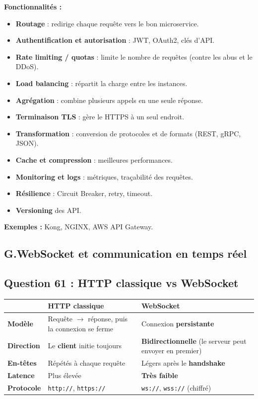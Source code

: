 \documentclass[12pt,a4paper]{article}
\begin{document}
\textbf{Fonctionnalit\'es :}
\begin{itemize}
  \item \textbf{Routage} : redirige chaque requ\^ete vers le bon microservice.
  \item \textbf{Authentification et autorisation} : JWT, OAuth2, cl\'es d'API.
  \item \textbf{Rate limiting / quotas} : limite le nombre de requ\^etes (contre les abus et le DDoS).
  \item \textbf{Load balancing} : r\'epartit la charge entre les instances.
  \item \textbf{Agr\'egation} : combine plusieurs appels en une seule r\'eponse.
  \item \textbf{Terminaison TLS} : g\`ere le HTTPS \`a un seul endroit.
  \item \textbf{Transformation} : conversion de protocoles et de formats (REST, gRPC, JSON).
  \item \textbf{Cache et compression} : meilleures performances.
  \item \textbf{Monitoring et logs} : m\'etriques, tra\c{c}abilit\'e des requ\^etes.
  \item \textbf{R\'esilience} : Circuit Breaker, retry, timeout.
  \item \textbf{Versioning} des API.
\end{itemize}

\noindent\textbf{Exemples :} Kong, NGINX, AWS API Gateway.

\subsection*{G.WebSocket et communication en temps r\'eel}

\subsection*{Question 61 : HTTP classique vs WebSocket}

\begin{table}[h!]
\centering
\begin{tabularx}{\textwidth}{@{}l Y Y@{}}
\toprule
 & \textbf{HTTP classique} & \textbf{WebSocket} \\
\midrule
\textbf{Mod\`ele} & Requ\^ete $\rightarrow$ r\'eponse, puis la connexion se ferme & Connexion \textbf{persistante} \\
\textbf{Direction} & Le \textbf{client} initie toujours & \textbf{Bidirectionnelle} (le serveur peut envoyer en premier) \\
\textbf{En-t\^etes} & R\'ep\'et\'es \`a chaque requ\^ete & L\'egers apr\`es le \textbf{handshake} \\
\textbf{Latence} & Plus \'elev\'ee & \textbf{Tr\`es faible} \\
\textbf{Protocole} & \texttt{http://}, \texttt{https://} & \texttt{ws://}, \texttt{wss://} (chiffr\'e) \\
\bottomrule
\end{tabularx}
\end{table}
\end{document}
